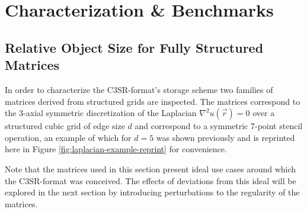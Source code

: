 \chapter{Characterization \& Benchmarks}

  \section{Relative Object Size for Fully Structured Matrices} \label{sec:rel-object-size-fully-structured}

    In order to characterize the C3SR-format's storage scheme two families of matrices derived from structured grids are
    inspected. The matrices correspond to the 3-axial symmetric discretization of the Laplacian $\nabla^2 u(\vec{r}) =
    0$ over a structured cubic grid of edge size $d$ and correspond to a symmetric 7-point stencil operation, an
    example of which for $d = 5$ was shown previously and is reprinted here in Figure
    \ref{fig:laplacian-example-reprint} for convenience.

    Note that the matrices used in this section present ideal use cases around which the C3SR-format was conceived. The
    effects of deviations from this ideal will be explored in the next section by introducing perturbations to the
    regularity of the matrices.

